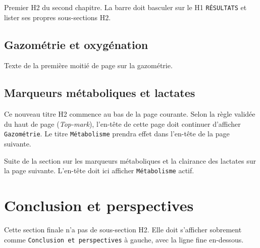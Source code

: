 \documentclass[
  french,
  10pt,
  a4paper,
]{scrartcl}
\begin{document}
Premier H2 du second chapitre. La barre doit basculer sur le H1
\texttt{RÉSULTATS} et lister ses propres sous-sections H2.

\newpage



\subsection{Gazométrie et
oxygénation}\label{gazomuxe9trie-et-oxyguxe9nation}

Texte de la première moitié de page sur la gazométrie.

\vspace{12cm}



\subsection{Marqueurs métaboliques et
lactates}\label{marqueurs-muxe9taboliques-et-lactates}

Ce nouveau titre H2 commence au bas de la page courante. Selon la règle
validée du haut de page (\emph{Top-mark}), l'en-tête de cette page doit
continuer d'afficher \texttt{Gazométrie}. Le titre \texttt{Métabolisme}
prendra effet dans l'en-tête de la page suivante.

\newpage

Suite de la section sur les marqueurs métaboliques et la clairance des
lactates sur la page suivante. L'en-tête doit ici afficher
\texttt{Métabolisme} actif.

\newpage

\clearpage


\section*{Conclusion et perspectives}\label{conclusion-et-perspectives}

Cette section finale n'a pas de sous-section H2. Elle doit s'afficher
sobrement comme \texttt{Conclusion\ et\ perspectives} à gauche, avec la
ligne fine en-dessous.
\end{document}
